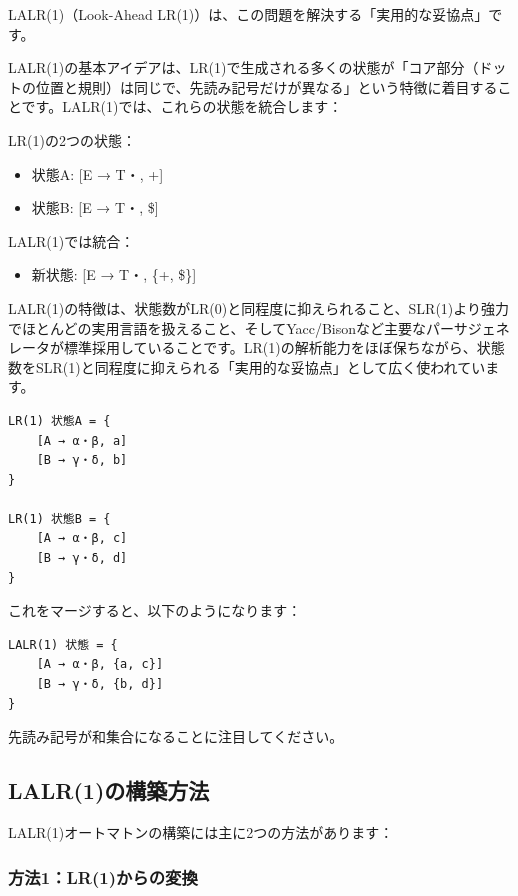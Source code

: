 LALR(1)（Look-Ahead
LR(1)）は、この問題を解決する「実用的な妥協点」です。

LALR(1)の基本アイデアは、LR(1)で生成される多くの状態が「コア部分（ドットの位置と規則）は同じで、先読み記号だけが異なる」という特徴に着目することです。LALR(1)では、これらの状態を統合します：

LR(1)の2つの状態：

\begin{itemize}
\tightlist
\item
  状態A: {[}E → T・, +{]}
\item
  状態B: {[}E → T・, \${]}
\end{itemize}

LALR(1)では統合：

\begin{itemize}
\tightlist
\item
  新状態: {[}E → T・, \{+, \$\}{]}
\end{itemize}

LALR(1)の特徴は、状態数がLR(0)と同程度に抑えられること、SLR(1)より強力でほとんどの実用言語を扱えること、そしてYacc/Bisonなど主要なパーサジェネレータが標準採用していることです。LR(1)の解析能力をほぼ保ちながら、状態数をSLR(1)と同程度に抑えられる「実用的な妥協点」として広く使われています。

\begin{verbatim}
LR(1) 状態A = {
    [A → α・β, a]
    [B → γ・δ, b]
}

LR(1) 状態B = {
    [A → α・β, c]
    [B → γ・δ, d]
}
\end{verbatim}

これをマージすると、以下のようになります：

\begin{verbatim}
LALR(1) 状態 = {
    [A → α・β, {a, c}]
    [B → γ・δ, {b, d}]
}
\end{verbatim}

先読み記号が和集合になることに注目してください。

\hypertarget{chapter5-lalr1ux306eux69cbux7bc9ux65b9ux6cd5}{%
\subsection{LALR(1)の構築方法}\label{chapter5-lalr1ux306eux69cbux7bc9ux65b9ux6cd5}}

LALR(1)オートマトンの構築には主に2つの方法があります：

\hypertarget{chapter5-ux65b9ux6cd51lr1ux304bux3089ux306eux5909ux63db}{%
\subsubsection{方法1：LR(1)からの変換}\label{chapter5-ux65b9ux6cd51lr1ux304bux3089ux306eux5909ux63db}}

